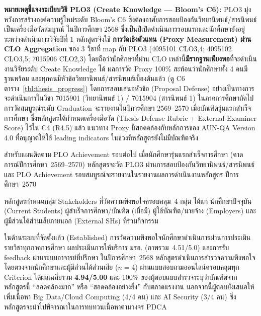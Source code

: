 \textbf{หมายเหตุชี้แจงระเบียบวิธี PLO3 (Create Knowledge --- Bloom's C6):} PLO3 มุ่งหวังการสร้างองค์ความรู้ใหม่ระดับ Bloom's C6 ซึ่งต้องอาศัยการสอบป้องกันวิทยานิพนธ์/สารนิพนธ์เป็นเครื่องมือวัดสมบูรณ์ ในปีการศึกษา 2568 ซึ่งเป็นปีเปิดดำเนินการรอบแรกและนักศึกษายังอยู่ระหว่างดำเนินการวิจัยปีที่ 1 หลักสูตรจึงใช้ \textbf{การวัดเชิงตัวแทน (Proxy Measurement) ผ่าน CLO Aggregation} ของ 3 วิชาที่ map กับ PLO3 (4095101 CLO3,4; 4095102 CLO3,5; 7015906 CLO2,3) โดยถือว่านักศึกษาที่ผ่าน CLO เหล่านี้\textbf{มีรากฐานเพียงพอ}ที่จะดำเนินงานวิจัยระดับ Create Knowledge ได้ ผลการวัด Proxy 100\% สะท้อนว่านักศึกษาทั้ง 4 คนมีฐานพร้อม และทุกคนมีหัวข้อวิทยานิพนธ์/สารนิพนธ์เบื้องต้นแล้ว (ดู C6 ตาราง~\ref{tbl:thesis_progress}) โดยการสอบเสนอหัวข้อ (Proposal Defense) อย่างเป็นทางการจะดำเนินการในวิชา 7015901 (วิทยานิพนธ์ 1) / 7015904 (สารนิพนธ์ 1) ในภาคการศึกษาถัดไป การวัดสมบูรณ์ระดับ Graduation จะรายงานในปีการศึกษา 2569--2570 เมื่อบัณฑิตรุ่นแรกสำเร็จการศึกษา ซึ่งหลักสูตรได้กำหนดเครื่องมือวัด (Thesis Defense Rubric + External Examiner Score) ไว้ใน C4 (R4.5) แล้ว แนวทาง Proxy นี้สอดคล้องกับหลักการของ AUN-QA Version 4.0 ที่อนุญาตให้ใช้ leading indicators ในช่วงที่หลักสูตรยังไม่มีบัณฑิตจริง

สำหรับแผนติดตาม PLO Achievement รอบต่อไป เมื่อนักศึกษารุ่นแรกสำเร็จการศึกษา (คาดการณ์ปีการศึกษา~2569--2570) หลักสูตรจะวัด PLO3 ผ่านการสอบป้องกันวิทยานิพนธ์/สารนิพนธ์ และ PLO Achievement รอบสมบูรณ์จะรายงานในรายงานผลการดำเนินงานหลักสูตร ปีการศึกษา~2570


หลักสูตรกำหนดกลุ่ม Stakeholders ที่วัดความพึงพอใจครอบคลุม~4 กลุ่ม ได้แก่ นักศึกษาปัจจุบัน (Current Students) ผู้สำเร็จการศึกษา/บัณฑิต (เมื่อมี) ผู้ใช้บัณฑิต/นายจ้าง (Employers) และผู้มีส่วนได้ส่วนเสียภายนอก (External SHs) ที่ร่วมกิจกรรม

ในด้านระบบที่จัดตั้งแล้ว (Established) การวัดความพึงพอใจนักศึกษาดำเนินการผ่านการประเมินรายวิชาทุกภาคการศึกษา ผลประเมินการให้บริการ มรอ. (ภาพรวม~4.51/5.0) และการรับ feedback ผ่านระบบอาจารย์ที่ปรึกษา ในปีการศึกษา~2568 หลักสูตรดำเนินการสำรวจความพึงพอใจโดยตรงจากนักศึกษาและผู้มีส่วนได้ส่วนเสีย ($n=4$) ผ่านแบบสอบถามออนไลน์ครอบคลุมทุก Criterion ได้ผลเฉลี่ยรวม \textbf{4.94/5.00} และ 100\% ของผู้ตอบแบบสำรวจระบุว่าบัณฑิตจากหลักสูตรนี้ ``สอดคล้องมาก'' หรือ ``สอดคล้องอย่างยิ่ง'' กับตลาดแรงงาน นอกจากนี้ผู้ตอบยังเสนอให้เพิ่มเนื้อหา Big Data/Cloud Computing (4/4 คน) และ AI Security (3/4 คน) ซึ่งหลักสูตรจะนำไปพิจารณาในการทบทวนเนื้อหาตามวงจร PDCA

